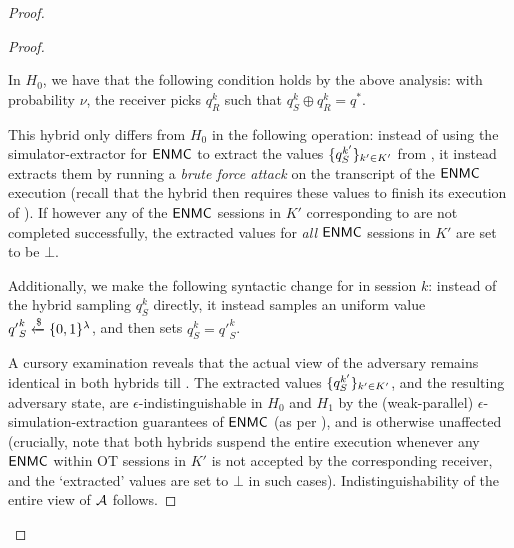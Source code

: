 \begin{proof}
\begin{proof}
        \begin{remark}
            In $H_0$, we have that the following condition holds by the above analysis: with probability $\nu$, the receiver picks $q^k_R$ such that $q^k_S \oplus q^k_R = q^*$.
        \end{remark}
           

         This hybrid only differs from $H_0$ in the following operation: instead of using the simulator-extractor for $\mathsf{ENMC}$ to extract the values $\{q_S^{k'}\}_{k' \in K'}$ from , it instead extracts them by running a {\em brute force attack} on the transcript of the  $\mathsf{ENMC}$ execution (recall that the hybrid then requires these values to finish its execution of ). If however any of the $\mathsf{ENMC}$ sessions in $K'$ corresponding to  are not completed successfully, the extracted values for {\em all} $\mathsf{ENMC}$ sessions in $K'$ are set to be $\bot$. 
        
        Additionally, we make the following syntactic change for  in session $k$: instead of the hybrid sampling $q^k_S$ directly, it instead samples an uniform value ${q'}_S^k \xleftarrow{\$} \{0,1\}^\lambda$, and then sets $q_S^k = {q'}_S^k$. 

        


         A cursory examination reveals that the actual view of the adversary remains identical in both hybrids till . The extracted values $\{q_S^{k'}\}_{k' \in K'}$, and the resulting adversary state, are $\epsilon$-indistinguishable in $H_0$ and $H_1$ by the (weak-parallel) $\epsilon$-simulation-extraction guarantees of $\mathsf{ENMC}$ (as per ), and   is otherwise unaffected (crucially, note that both hybrids suspend the entire execution whenever any $\mathsf{ENMC}$ within OT sessions in $K'$ is not accepted by the corresponding receiver, and the `extracted' values are set to $\bot$ in such cases). Indistinguishability of the entire view of $\mathcal{A}$ follows. 


\end{proof}
\end{proof}
